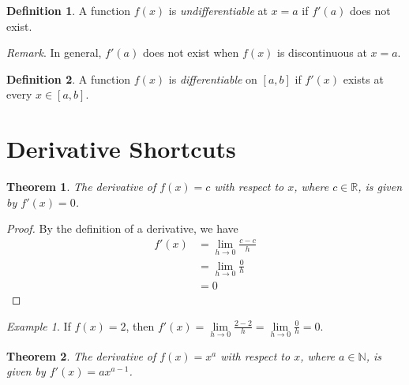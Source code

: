 \documentclass{article}
\theoremstyle{plain}
\newtheorem{theorem}{Theorem}
\theoremstyle{definition}
\newtheorem{definition}{Definition}
\theoremstyle{remark}
\newtheorem{example}{Example}
\newcommand{\N}{\mathbb{N}}
\newcommand{\R}{\mathbb{R}}
\begin{document}
\begin{definition}
    A function $f(x)$ is \textit{undifferentiable} at $x=a$ if $f'(a)$ does not exist.
\end{definition}

\textit{Remark}.
    In general, $f'(a)$ does not exist when $f(x)$ is discontinuous at $x=a$.

\begin{definition}
    A function $f(x)$ is  \textit{differentiable} on $[a,b]$ if $f'(x)$ exists at every $x\in[a,b]$.
\end{definition}


\section{Derivative Shortcuts}
\begin{theorem}
    The derivative of $f(x)=c$ with respect to $x$, where $c\in\R$, is given by $f'(x)=0$.
\end{theorem} 

\begin{proof}
    By the definition of a derivative, we have
    	\begin{align*}
		f'(x)
			&=	\lim\limits_{h\to0}\frac{c-c}{h}\\
			&=	\lim\limits_{h\to0}\frac{0}{h}\\
			&=	0
	\end{align*}
\end{proof}

\begin{example}
    If $f(x)=2$, then $f'(x)=\lim\limits_{h\to0}\frac{2-2}{h}=\lim\limits_{h\to0}\frac{0}{h}=0$.
\end{example}

\begin{theorem}
    The derivative of $f(x)=x^a$ with respect to $x$, where $a\in\N$, is given by $f'(x)=ax^{a-1}$.
\end{theorem}
   
\end{document}
